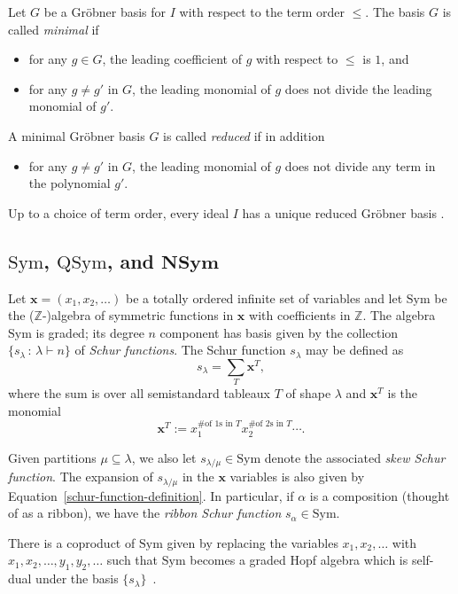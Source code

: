 \documentclass[ALCO,ThmDefs,published]{cedram}
\newcommand{\xx}{{\mathbf {x}}}
\theoremstyle{plain}
\newcommand{\NSym}{{\mathbf {NSym}}}
\newcommand{\Sym}{{\mathrm {Sym}}}
\newcommand{\QSym}{{\mathrm {QSym}}}
\newcommand{\ZZ}{{\mathbb {Z}}}
\newcommand{\xx}{{\mathbf {x}}}
\begin{document}
Let $G$ be a Gr\"obner basis for $I$ with respect to the
term order $\leq$.  The basis $G$ is called \emph{minimal} if
\begin{itemize}
\item for any $g \in G$, the leading coefficient of $g$ with respect to $\leq$ is $1$, and
\item for any $g \neq g'$ in $G$, the leading monomial of $g$ does not divide the leading monomial of $g'$.
\end{itemize}
A minimal Gr\"obner basis $G$ is called \emph{reduced} if in addition 
\begin{itemize}
\item  for any $g \neq g'$ in $G$, the leading monomial of $g$ does not divide any term in the polynomial $g'$.
\end{itemize}
Up to a choice of term order,
every ideal $I$ has a unique reduced Gr\"obner basis \cite[Prop. 6, p. 92]{CLO}.



\subsection{$\Sym$, $\QSym$, and $\NSym$}
Let $\xx = (x_1, x_2, \dots )$ be a totally ordered infinite set of variables 
and let $\Sym$ be the ($\ZZ$-)algebra of symmetric functions in $\xx$ with coefficients in $\ZZ$.
The algebra $\Sym$ is graded; its degree $n$ component has basis given by the collection
$\{s_{\lambda} \,:\, \lambda \vdash n\}$ of \emph{Schur functions}.  The Schur function $s_{\lambda}$
may be defined as 
\begin{equation}
\label{schur-function-definition}
s_{\lambda} = \sum_T \xx^T,
\end{equation}
where the sum is over all semistandard tableaux $T$ of shape $\lambda$ and $\xx^T$ is the monomial
\begin{equation}
\xx^T := x_1^{\# \text{of 1s in $T$}} x_2^{\# \text{of 2s in $T$}} \cdots.
\end{equation}

Given partitions $\mu \subseteq \lambda$, we also let $s_{\lambda/\mu} \in \Sym$ denote the associated
\emph{skew Schur function}.  The expansion of $s_{\lambda/\mu}$ in the $\xx$ variables is also given by 
Equation~\eqref{schur-function-definition}.
In particular, if $\alpha$ is a composition (thought of as a ribbon), we have the
\emph{ribbon Schur function} $s_{\alpha} \in \Sym$.

There is a coproduct of $\Sym$ given by replacing the variables $x_1,x_2,\ldots$ with $x_1,x_2,\ldots, y_1, y_2,\ldots$ such that $\Sym$ becomes a graded Hopf algebra which is self-dual under the basis $\{s_\lambda\}$~\cite[\S2]{GrinbergReiner}.
\end{document}
